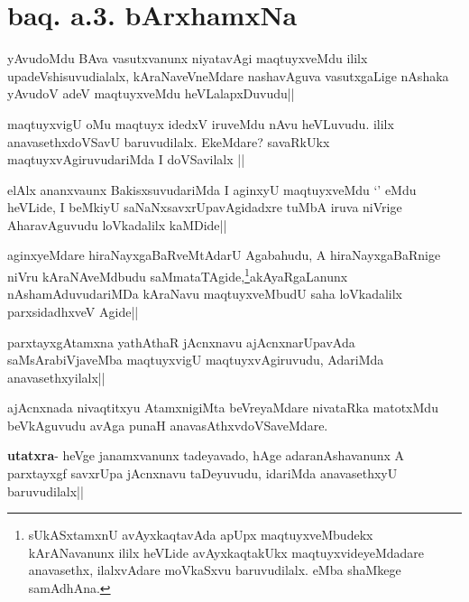 \section*{baq. a.3. bArxhamxNa}


\begin{artha}
yAvudoMdu BAva vasutxvanunx niyatavAgi maqtuyxveMdu ililx upadeVshisuvudialalx, 
kAraNaveVneMdare nashavAguva vasutxgaLige nAshaka yAvudoV adeV maqtuyxveMdu heVLalapxDuvudu||
\end{artha}


\begin{artha}
maqtuyxvigU oMu maqtuyx idedxV iruveMdu nAvu heVLuvudu. ililx anavasethxdoVSavU 
baruvudilalx. EkeMdare? savaRkUkx maqtuyxvAgiruvudariMda I doVSavilalx ||
\end{artha}

\begin{artha}
elAlx ananxvaunx BakisxsuvudariMda I aginxyU maqtuyxveMdu `\stext'  eMdu heVLide, I 
beMkiyU saNaNxsavxrUpavAgidadxre tuMbA iruva niVrige AharavAguvudu loVkadalilx kaMDide||
\end{artha}


\begin{artha}
aginxyeMdare hiraNayxgaBaRveMtAdarU Agabahudu, A hiraNayxgaBaRnige niVru kAraNAveMdbudu 
saMmataTAgide,\footnote{sUkASxtamxnU avAyxkaqtavAda apUpx maqtuyxveMbudekx kArANavanunx  
ililx heVLide avAyxkaqtakUkx maqtuyxvideyeMdadare anavasethx, ilalxvAdare moVkaSxvu 
baruvudilalx. eMba shaMkege samAdhAna.}akAyaRgaLanunx nAshamAduvudariMDa kAraNavu 
maqtuyxveMbudU saha loVkadalilx 
parxsidadhxveV Agide||
\end{artha}

\begin{artha}
parxtayxgAtamxna yathAthaR jAcnxnavu ajAcnxnarUpavAda saMsArabiVjaveMba maqtuyxvigU maqtuyxvAgiruvudu, AdariMda anavasethxyilalx||
\end{artha}

\begin{artha}
ajAcnxnada nivaqtitxyu AtamxnigiMta beVreyaMdare nivataRka matotxMdu beVkAguvudu avAga 
punaH anavasAthxvdoVSaveMdare.

\textbf{utatxra}- heVge janamxvanunx tadeyavado, hAge adaranAshavanunx A parxtayxgf 
savxrUpa jAcnxnavu taDeyuvudu, idariMda anavasethxyU baruvudilalx||
\end{artha}

